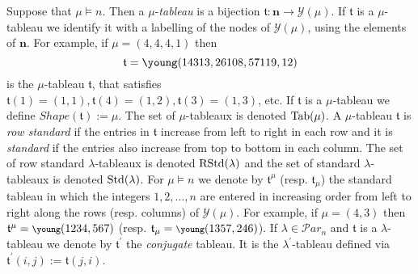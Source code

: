 \documentclass[10pt,a4,twoside,hidelinks,rm]{article}
\newcommand{\Par}{{\mathcal Par}_n}
\newcommand{\Y}{\mathcal{Y}}
\newcommand\diez{{10}}
\newcommand\once{{11}}
\newcommand\doce{{12}}
\newcommand\trece{{13}}
\newcommand{\T}{\mathfrak{t}}
\newcommand{\std}{{\rm Std}}
\newcommand{\rstd}{{\rm RStd}}
\newcommand{\Tab}{{\rm Tab}}
\theoremstyle{plain}
\begin{document}
\medskip
Suppose that $\mu\models n$. Then a $\mu$-\textit{tableau} is 
a bijection $\T: \mathbf{n} \to  \Y(\mu) $. 
If $\T $ is a $ \mu$-tableau we identify it with 
a labelling of the nodes of $ \Y(\mu) $, using the elements of $ \mathbf{n} $.
For example, if $\mu=(4,4,4,1)$ then
\begin{equation}\T = {\young(143\trece,26\diez8,57\once9,\doce)} \end{equation}
is the $\mu$-tableau $ \T$, that satisfies $ \T(1) = (1,1) , \T(4) = (1,2) , \T(3) = (1,3) $, etc.
If $\T $ is a $ \mu $-tableau we define $ Shape(\mathfrak{t}) :=   \mu $.
The set of $ \mu$-tableaux is denoted $ \Tab(\mu)$.
A $\mu$-tableau $\mathfrak{t}$ is \textit{row standard}
if the entries in $\mathfrak{t}$ increase from left to right in each
row and it is \textit{standard} if the entries also increase from
top to bottom {in each column}. The set of
row standard
$\lambda$-tableaux is denoted $\rstd(\lambda)$ and the set of standard $ \lambda $-
tableaux is denoted 
$\std(\lambda)$. For 
$\mu \models n $ we denote by $\mathfrak{t}^{\mu}$ (resp. $\mathfrak{t}_{\mu}   $) the standard
tableau in which the integers $1,2,\ldots,n$ are entered in
increasing order from left to right along the rows (resp. columns) of $\Y(\mu)$. For
example, if $\mu=(4,3)$
then $\T^{\mu}={\footnotesize\young(1234,567)}$ (resp.
$\T_{\mu}={\footnotesize\young(1357,246)}$).
If $ \lambda \in \Par $ and $ \T $ is a $ \lambda$-tableau we denote by $ \T^{\prime} $ the
\textit{conjugate} tableau. It is the $ \lambda^{\prime} $-tableau defined via
$ \T^{\prime}(i,j) := \T(j,i)$. 
\end{document}
